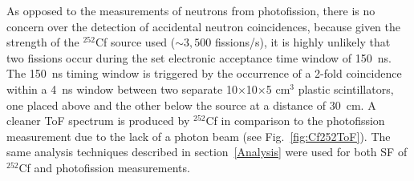 As opposed to the measurements of neutrons from photofission, there is no concern over the detection of accidental neutron coincidences, because given the strength of the $^{252}$Cf source used ($\sim 3,500$ fissions/s), it is highly unlikely that two fissions occur during the set electronic acceptance time window of 150~ns.
The 150~ns timing window is triggered by the occurrence of a 2-fold coincidence within a 4~ns window between two separate 10$\times$10$\times$5 cm$^3$ plastic scintillators, one placed above and the other below the source at a distance of 30~cm.
A cleaner ToF spectrum is produced by $^{252}$Cf in comparison to the photofission measurement due to the lack of a photon beam (see Fig.~\ref{fig:Cf252ToF}).
The same analysis techniques described in section~\ref{Analysis} were used for both SF of $^{252}$Cf and photofission measurements.
